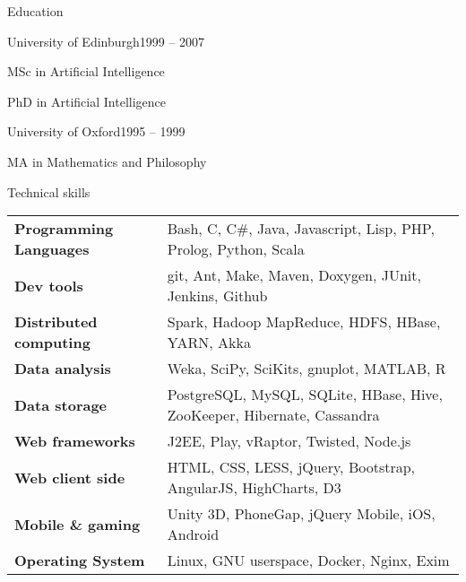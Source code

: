 \documentclass{resume} %
\begin{document}

\begin{rSection}{Education}
\begin{rSubsection}{University of Edinburgh}{1999 -- 2007}{}{}
\item MSc in Artificial Intelligence
\item PhD in Artificial Intelligence
\end{rSubsection}

\begin{rSubsection}{University of Oxford}{1995 -- 1999}{}{}
\item MA in Mathematics and Philosophy
\end{rSubsection}
\end{rSection}


\begin{rSection}{Technical skills}

\begin{tabular}{ @{} >{\bfseries}l @{\hspace{6ex}} l }
Programming Languages & Bash, C, C\#, Java, Javascript, Lisp, PHP, Prolog, Python, Scala \\
Dev tools & git, Ant, Make, Maven, Doxygen, JUnit, Jenkins, Github \\
Distributed computing & Spark, Hadoop MapReduce, HDFS, HBase, YARN, Akka \\
Data analysis & Weka, SciPy, SciKits, gnuplot, MATLAB, R \\
Data storage & PostgreSQL, MySQL, SQLite, HBase, Hive, ZooKeeper, Hibernate, Cassandra \\
Web frameworks & J2EE, Play, vRaptor, Twisted, Node.js \\
Web client side & HTML, CSS, LESS, jQuery, Bootstrap, AngularJS, HighCharts, D3 \\
Mobile \& gaming & Unity 3D, PhoneGap, jQuery Mobile, iOS, Android \\
Operating System & Linux, GNU userspace, Docker, Nginx, Exim \\
\end{tabular}

\end{rSection}
\end{document}
